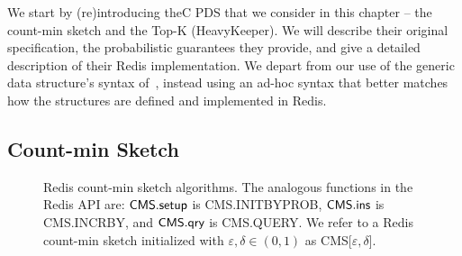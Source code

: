 We start by (re)introducing theC PDS that we consider in this chapter -- the count-min sketch and the Top-K (HeavyKeeper). We will describe their original specification, the probabilistic guarantees they provide, and give a detailed description of their Redis implementation. We depart from our use of the generic data structure's syntax of~\cite{clayton2019}, instead using an ad-hoc syntax that better matches how the structures are defined and implemented in Redis. 

\subsection{Count-min Sketch}
\label{sec:cms-intro}

\begin{figure*}[h]
    \centering
\begin{pcvstack}[boxed,space=1em]
\begin{pchstack}
    \begin{pcvstack}[space=0.5em]
       \end{pcvstack}
    \begin{pcvstack}[space=0.5em]
    \end{pcvstack}	
\end{pchstack}		
\end{pcvstack}
\caption[The Redis CMS Structure.]{Redis count-min sketch algorithms. 
The analogous functions in the Redis API are: $\textsf{CMS}.\textsf{setup}$ is \textsf{CMS.INITBYPROB}, $\textsf{CMS}.\textsf{ins}$ is \textsf{CMS.INCRBY}, and $\textsf{CMS}.\textsf{qry}$ is \textsf{CMS.QUERY}.
We refer to a Redis count-min sketch initialized with $\varepsilon, \delta \in (0,1)$ as CMS[$\varepsilon, \delta$].} 
\label{fig:redis-cms}
\end{figure*}

